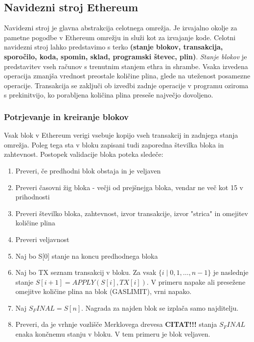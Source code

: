 \documentclass[a4paper, 12pt]{book}
\begin{document}
\subsection{Navidezni stroj Ethereum}

Navidezni stroj je glavna abstrakcija celotnega omrežja.
Je izvajalno okolje za pametne pogodbe v Ethereum omrežju in služi kot  za izvajanje kode.
Celotni navidezni stroj lahko predstavimo s terko \textbf{(stanje blokov, transakcija, sporočilo, koda, spomin, sklad, programski števec, plin)}.
\textit{Stanje blokov} je predstavitev vseh računov s trenutnim stanjem ethra in shrambe.
Vsaka izvedena operacija zmanjša vrednost preostale količine plina, glede na uteženost posamezne operacije.
Transakcija se zaključi ob izvedbi zadnje operacije v programu oziroma s prekinitvijo, ko porabljena količina plina preseše največjo dovoljeno.


\subsubsection{Potrjevanje in kreiranje blokov}
Vsak blok v Ethereum verigi vsebuje kopijo vseh transakcij in zadnjega stanja omrežja.
Poleg tega sta v bloku zapisani tudi zaporedna številka bloka in zahtevnost.
Postopek validacije bloka poteka sledeče:
\begin{enumerate}
\item Preveri, če predhodni blok obstaja in je veljaven
\item Preveri časovni žig bloka - večji od prejšnejga bloka, vendar ne več kot 15 v prihodnosti
\item Preveri številko bloka, zahtevnost, izvor transakcije, izvor "strica" in omejitev količine plina
\item Preveri veljavnost 
\item Naj bo S[0] stanje na koncu predhodnega bloka
\item Naj bo TX seznam transakcij v bloku. Za vsak 
$\{i \mid 0,1,\dots, n-1\}$
je naslednje stanje
 $S[i+1] = APPLY(S[i], TX[i])$.
V primeru napake ali presežene omejitve količine plina na blok (GASLIMIT), vrni napako.
\item Naj $S_FINAL = S[n]$. Nagrada za najden blok se izplača samo najditelju.
\item Preveri, da je vrhnje vozlišče Merklovega drevesa \textbf{CITAT!!!} stanja $S_FINAL$ enaka končnemu stanju v bloku. V tem primeru je blok veljaven.
\end{enumerate}
\end{document}
